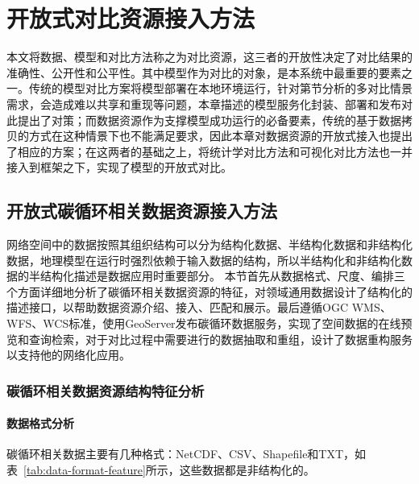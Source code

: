 \chapter{开放式对比资源接入方法}
本文将数据、模型和对比方法称之为对比资源，这三者的开放性决定了对比结果的准确性、公开性和公平性。其中模型作为对比的对象，是本系统中最重要的要素之一。传统的模型对比方案将模型部署在本地环境运行，针对第\label{sec:scene}节分析的多对比情景需求，会造成难以共享和重现等问题，本章描述的模型服务化封装、部署和发布对此提出了对策；而数据资源作为支撑模型成功运行的必备要素，传统的基于数据拷贝的方式在这种情景下也不能满足要求，因此本章对数据资源的开放式接入也提出了相应的方案；在这两者的基础之上，将统计学对比方法和可视化对比方法也一并接入到框架之下，实现了模型的开放式对比。

\section{开放式碳循环相关数据资源接入方法}
网络空间中的数据按照其组织结构可以分为结构化数据、半结构化数据和非结构化数据，地理模型在运行时强烈依赖于输入数据的结构，所以半结构化和非结构化数据的半结构化描述是数据应用时重要部分。
本节首先从数据格式、尺度、编排三个方面详细地分析了碳循环相关数据资源的特征，对领域通用数据设计了结构化的描述接口，以帮助数据资源介绍、接入、匹配和展示。最后遵循OGC WMS、WFS、WCS标准，使用GeoServer发布碳循环数据服务，实现了空间数据的在线预览和查询检索，对于对比过程中需要进行的数据抽取和重组，设计了数据重构服务以支持他的网络化应用。

\subsection{碳循环相关数据资源结构特征分析}
\subsubsection{数据格式分析}
碳循环相关数据主要有几种格式：NetCDF、CSV、Shapefile和TXT，如表~\ref{tab:data-format-feature}所示，这些数据都是非结构化的。

